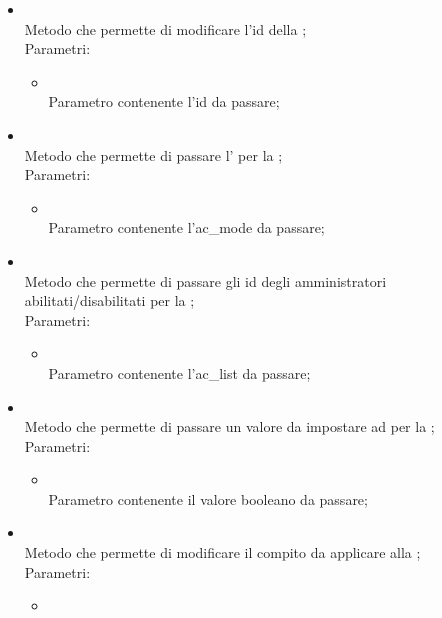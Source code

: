 \begin{itemize}
\begin{itemize}
		\item[]  \\
		Metodo che permette di modificare l'id della ;\\
		Parametri:
		\begin{itemize}
			\item {} \\
			Parametro contenente l'id da passare;
		\end{itemize}
		\item[]  \\
		Metodo che permette di passare l' per la ;\\
		Parametri:
		\begin{itemize}
			\item {} \\
			Parametro contenente l'ac\_mode da passare;
		\end{itemize}
		\item[]  \\
		Metodo che permette di passare gli id degli amministratori abilitati/disabilitati per la ;\\
		Parametri:
		\begin{itemize}
			\item {} \\
			Parametro contenente l'ac\_list da passare;
		\end{itemize}
		\item[]  \\
		Metodo che permette di passare un valore da impostare ad  per la ;\\
		Parametri:
		\begin{itemize}
			\item {} \\
			Parametro contenente il valore booleano da passare;
		\end{itemize}
		\item[]  \\
		Metodo che permette di modificare il compito da applicare alla ;\\
		Parametri:
		\begin{itemize}
			\item {} \\

\end{itemize}
\end{itemize}
\end{itemize}
